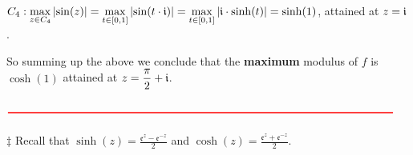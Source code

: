 \documentclass[11pt]{amsart}
\newcommand{\dsp}{\displaystyle}
\begin{document}
$\dsp C_4: \max_{z\in C_{4}}\left|\sin(z)\right|=\max_{t\in\left[0,1\right]}\left|\sin(t\cdot \mi )\right|=\max_{t\in\left[0,1\right]}\left|\mi\cdot \sinh(t )\right|=\sinh(1)$, attained at $\dsp z=\mi$.

So summing up the above we conclude that the \textbf{maximum} modulus of $f$ is 
$\dsp\cosh(1)$ attained at $\dsp z =\frac{\pi}{2}+\mi$.

$\color{red}\rule{\textwidth}{1pt}$\\\\
$\ddag$ Recall that $\dsp\sinh⁡(z)=\frac{\mathfrak{e}^{z}-\mathfrak{e}^{-z}}{2}$ and 
$\dsp \cosh(z)=\frac{\mathfrak{e}^{z} + \mathfrak{e}^{-z}}{2}$.
\end{document}
